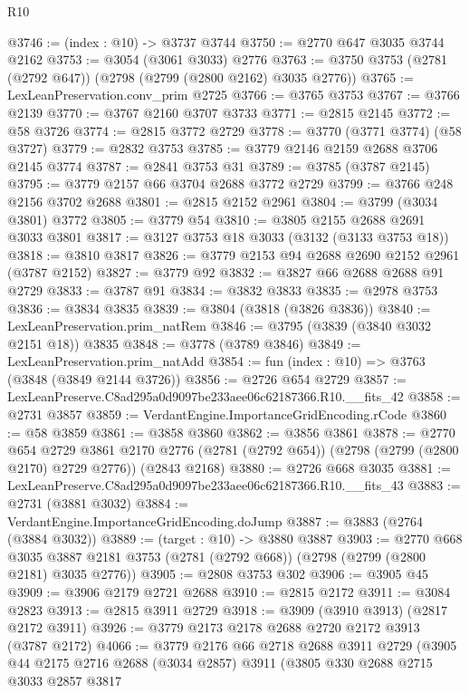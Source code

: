 \begin{lexlean}{R10}
\begin{coremodule}
@3746 := (index : @10) -> @3737 @3744
@3750 := @2770 @647 @3035 @3744 @2162
@3753 := @3054 (@3061 @3033) @2776
@3763 := @3750 @3753 (@2781 (@2792 @647)) (@2798 (@2799 (@2800 @2162) @3035 @2776))
@3765 := LexLeanPreservation.conv_prim @2725
@3766 := @3765 @3753
@3767 := @3766 @2139
@3770 := @3767 @2160 @3707 @3733
@3771 := @2815 @2145
@3772 := @58 @3726
@3774 := @2815 @3772 @2729
@3778 := @3770 (@3771 @3774) (@58 @3727)
@3779 := @2832 @3753
@3785 := @3779 @2146 @2159 @2688 @3706 @2145 @3774
@3787 := @2841 @3753 @31
@3789 := @3785 (@3787 @2145)
@3795 := @3779 @2157 @66 @3704 @2688 @3772 @2729
@3799 := @3766 @248 @2156 @3702 @2688
@3801 := @2815 @2152 @2961
@3804 := @3799 (@3034 @3801) @3772
@3805 := @3779 @54
@3810 := @3805 @2155 @2688 @2691 @3033 @3801
@3817 := @3127 @3753 @18 @3033 (@3132 (@3133 @3753 @18))
@3818 := @3810 @3817
@3826 := @3779 @2153 @94 @2688 @2690 @2152 @2961 (@3787 @2152)
@3827 := @3779 @92
@3832 := @3827 @66 @2688 @2688 @91 @2729
@3833 := @3787 @91
@3834 := @3832 @3833
@3835 := @2978 @3753
@3836 := @3834 @3835
@3839 := @3804 (@3818 (@3826 @3836))
@3840 := LexLeanPreservation.prim_natRem
@3846 := @3795 (@3839 (@3840 @3032 @2151 @18)) @3835
@3848 := @3778 (@3789 @3846)
@3849 := LexLeanPreservation.prim_natAdd
@3854 := fun (index : @10) => @3763 (@3848 (@3849 @2144 @3726))
@3856 := @2726 @654 @2729
@3857 := LexLeanPreserve.C8ad295a0d9097be233aee06c62187366.R10.__fits_42
@3858 := @2731 @3857
@3859 := VerdantEngine.ImportanceGridEncoding.rCode
@3860 := @58 @3859
@3861 := @3858 @3860
@3862 := @3856 @3861
@3878 := @2770
    @654
    @2729
    @3861
    @2170
    @2776
    (@2781 (@2792 @654))
    (@2798 (@2799 (@2800 @2170) @2729 @2776))
    (@2843 @2168)
@3880 := @2726 @668 @3035
@3881 := LexLeanPreserve.C8ad295a0d9097be233aee06c62187366.R10.__fits_43
@3883 := @2731 (@3881 @3032)
@3884 := VerdantEngine.ImportanceGridEncoding.doJump
@3887 := @3883 (@2764 (@3884 @3032))
@3889 := (target : @10) -> @3880 @3887
@3903 := @2770
    @668
    @3035
    @3887
    @2181
    @3753
    (@2781 (@2792 @668))
    (@2798 (@2799 (@2800 @2181) @3035 @2776))
@3905 := @2808 @3753 @302
@3906 := @3905 @45
@3909 := @3906 @2179 @2721 @2688
@3910 := @2815 @2172
@3911 := @3084 @2823
@3913 := @2815 @3911 @2729
@3918 := @3909 (@3910 @3913) (@2817 @2172 @3911)
@3926 := @3779 @2173 @2178 @2688 @2720 @2172 @3913 (@3787 @2172)
@4066 := @3779
    @2176
    @66
    @2718
    @2688
    @3911
    @2729
    (@3905
      @44
      @2175
      @2716
      @2688
      (@3034 @2857)
      @3911
      (@3805
        @330
        @2688
        @2715
        @3033
        @2857
        @3817

\end{coremodule}
\end{lexlean}
